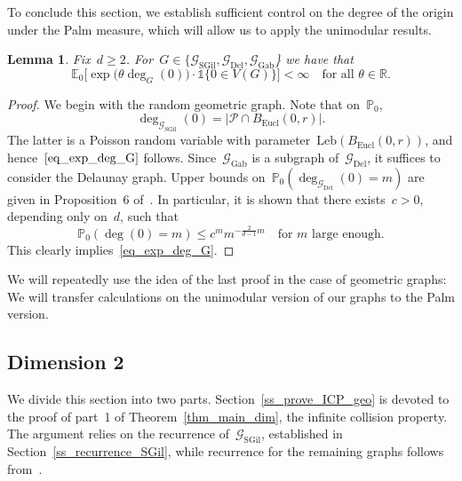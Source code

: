 \documentclass[a4paper,11pt]{article}
\newcommand{\EE}{\mathbb{E}}
\newcommand{\PP}{\mathbb{P}}
\newcommand{\RR}{\mathbb{R}}
\newtheorem{lemma}{Lemma}
\theoremstyle{definition}
\begin{document}
To conclude this section, we establish sufficient control on the degree of the origin under the Palm measure, which will allow us to apply the unimodular results. 
\begin{lemma}\label{lemma_fin_deg_to_unim}
Fix~$d \ge 2$. For~$G \in \{ \mathcal{G}_\mathrm{SGil}, \mathcal{G}_\mathrm{Del}, \mathcal G_\mathrm{Gab}$\} we have that
\begin{equation}\label{eq_exp_deg_G}
\EE_0 \big[ \exp \big( \theta \deg_G(0) \big) \cdot \mathds{1}\{0 \in V(G)\} \big] < \infty \quad \text{for all } \theta \in \RR.
\end{equation}
\end{lemma}
\begin{proof}
We begin with the random geometric graph. Note that on~$\PP_0$,
$$ \deg_{\mathcal{G}_\mathrm{SGil}}(0) = |\mathcal P \cap B_\mathrm{Eucl}(0,r)|.$$
The latter is a Poisson random variable with parameter~$\mathrm{Leb}(B_\mathrm{Eucl}(0,r))$, and hence~$\eqref{eq_exp_deg_G}$ follows. Since~$\mathcal{G}_\mathrm{Gab}$ is a subgraph of~$\mathcal{G}_\mathrm{Del}$, it suffices to consider the Delaunay graph. Upper bounds on~$\PP_0 (\deg_{\mathcal{G}_\mathrm{Del}}(0) = m)$ are given in Proposition~6 of~\cite{Bonnet20}. In particular, it is shown that there exists~$c > 0$, depending only on~$d$, such that
$$\PP_0 (\deg(0) = m) \leq c^m m^{-\frac{2}{d-1}m} \quad \text{for } m \text{ large enough}.  $$
This clearly implies~\eqref{eq_exp_deg_G}.
\end{proof}
We will repeatedly use the idea of the last proof in the case of geometric graphs: We will transfer calculations on the unimodular version of our graphs to the Palm version.

\subsection{Dimension 2}\label{ss_dim_2}
We divide this section into two parts. Section~\ref{ss_prove_ICP_geo} is devoted to the proof of part~1 of Theorem~\ref{thm_main_dim}, the infinite collision property. The argument relies on the recurrence of~$\mathcal G_\mathrm{SGil}$, established in Section~\ref{ss_recurrence_SGil}, while recurrence for the remaining graphs follows from~\cite{recurrenceVoronoiPPP}.
\end{document}
